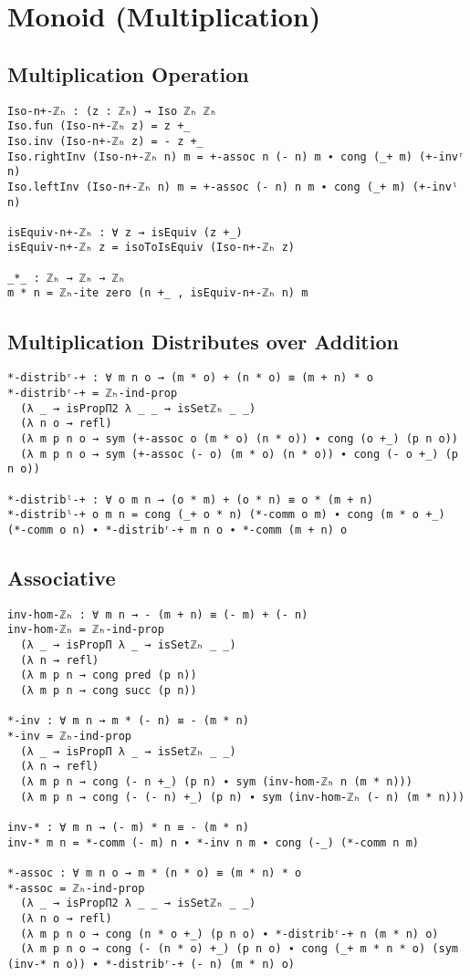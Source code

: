 \chapter{Monoid (Multiplication)}
\label{ch:monoid}

\section{Multiplication Operation}
\begin{verbatim}
Iso-n+-ℤₕ : (z : ℤₕ) → Iso ℤₕ ℤₕ
Iso.fun (Iso-n+-ℤₕ z) = z +_
Iso.inv (Iso-n+-ℤₕ z) = - z +_
Iso.rightInv (Iso-n+-ℤₕ n) m = +-assoc n (- n) m ∙ cong (_+ m) (+-invʳ n)
Iso.leftInv (Iso-n+-ℤₕ n) m = +-assoc (- n) n m ∙ cong (_+ m) (+-invˡ n)

isEquiv-n+-ℤₕ : ∀ z → isEquiv (z +_)
isEquiv-n+-ℤₕ z = isoToIsEquiv (Iso-n+-ℤₕ z)

_*_ : ℤₕ → ℤₕ → ℤₕ
m * n = ℤₕ-ite zero (n +_ , isEquiv-n+-ℤₕ n) m
\end{verbatim}

\section{Multiplication Distributes over Addition}
\begin{verbatim}
*-distribʳ-+ : ∀ m n o → (m * o) + (n * o) ≡ (m + n) * o
*-distribʳ-+ = ℤₕ-ind-prop
  (λ _ → isPropΠ2 λ _ _ → isSetℤₕ _ _)
  (λ n o → refl)
  (λ m p n o → sym (+-assoc o (m * o) (n * o)) ∙ cong (o +_) (p n o))
  (λ m p n o → sym (+-assoc (- o) (m * o) (n * o)) ∙ cong (- o +_) (p n o))

*-distribˡ-+ : ∀ o m n → (o * m) + (o * n) ≡ o * (m + n)
*-distribˡ-+ o m n = cong (_+ o * n) (*-comm o m) ∙ cong (m * o +_) (*-comm o n) ∙ *-distribʳ-+ m n o ∙ *-comm (m + n) o
\end{verbatim}

\section{Associative}
\begin{verbatim}
inv-hom-ℤₕ : ∀ m n → - (m + n) ≡ (- m) + (- n)
inv-hom-ℤₕ = ℤₕ-ind-prop
  (λ _ → isPropΠ λ _ → isSetℤₕ _ _)
  (λ n → refl)
  (λ m p n → cong pred (p n))
  (λ m p n → cong succ (p n))

*-inv : ∀ m n → m * (- n) ≡ - (m * n)
*-inv = ℤₕ-ind-prop
  (λ _ → isPropΠ λ _ → isSetℤₕ _ _)
  (λ n → refl)
  (λ m p n → cong (- n +_) (p n) ∙ sym (inv-hom-ℤₕ n (m * n)))
  (λ m p n → cong (- (- n) +_) (p n) ∙ sym (inv-hom-ℤₕ (- n) (m * n)))

inv-* : ∀ m n → (- m) * n ≡ - (m * n)
inv-* m n = *-comm (- m) n ∙ *-inv n m ∙ cong (-_) (*-comm n m)

*-assoc : ∀ m n o → m * (n * o) ≡ (m * n) * o
*-assoc = ℤₕ-ind-prop
  (λ _ → isPropΠ2 λ _ _ → isSetℤₕ _ _)
  (λ n o → refl)
  (λ m p n o → cong (n * o +_) (p n o) ∙ *-distribʳ-+ n (m * n) o)
  (λ m p n o → cong (- (n * o) +_) (p n o) ∙ cong (_+ m * n * o) (sym (inv-* n o)) ∙ *-distribʳ-+ (- n) (m * n) o)
\end{verbatim}
